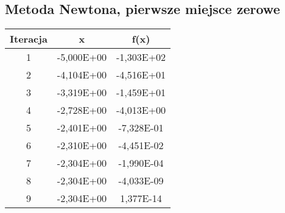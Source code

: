 \documentclass[12pt]{article}
\begin{document}
\subsection{Metoda Newtona, pierwsze miejsce zerowe}
\begin{table}[!htbp]
\centering
\begin{longtable}{|c|c|c|} 
    \hline
    \textbf{Iteracja} & \textbf{x} & \textbf{f(x)} \\
    \hline\hline
    1 & -5,000E+00  &	-1,303E+02   \\ \hline
    2 & -4,104E+00  &	-4,516E+01   \\ \hline
    3 & -3,319E+00  &	-1,459E+01   \\ \hline
    4 & -2,728E+00  &	-4,013E+00   \\ \hline
    5 & -2,401E+00  &	-7,328E-01   \\ \hline
    6 & -2,310E+00  &	-4,451E-02   \\ \hline
    7 & -2,304E+00  &	-1,990E-04   \\ \hline
    8 & -2,304E+00  &	-4,033E-09   \\ \hline
    9 & -2,304E+00  &	1,377E-14   \\ \hline
\end{longtable}
\label{table:samples2}
\end{table}
\FloatBarrier

\clearpage
\end{document}
